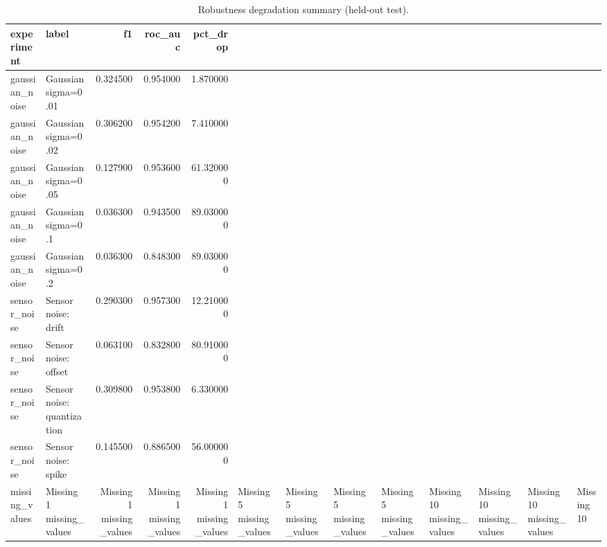 \begin{table}
\caption{Robustness degradation summary (held-out test).}
\label{tab:robustness}
\begin{tabular}{llrrr}
\toprule
experiment & label & f1 & roc_auc & pct_drop \\
\midrule
gaussian_noise & Gaussian sigma=0.01 & 0.324500 & 0.954000 & 1.870000 \\
gaussian_noise & Gaussian sigma=0.02 & 0.306200 & 0.954200 & 7.410000 \\
gaussian_noise & Gaussian sigma=0.05 & 0.127900 & 0.953600 & 61.320000 \\
gaussian_noise & Gaussian sigma=0.1 & 0.036300 & 0.943500 & 89.030000 \\
gaussian_noise & Gaussian sigma=0.2 & 0.036300 & 0.848300 & 89.030000 \\
sensor_noise & Sensor noise: drift & 0.290300 & 0.957300 & 12.210000 \\
sensor_noise & Sensor noise: offset & 0.063100 & 0.832800 & 80.910000 \\
sensor_noise & Sensor noise: quantization & 0.309800 & 0.953800 & 6.330000 \\
sensor_noise & Sensor noise: spike & 0.145500 & 0.886500 & 56.000000 \\
missing_values & Missing 1%
missing_values & Missing 1%
missing_values & Missing 1%
missing_values & Missing 1%
missing_values & Missing 5%
missing_values & Missing 5%
missing_values & Missing 5%
missing_values & Missing 5%
missing_values & Missing 10%
missing_values & Missing 10%
missing_values & Missing 10%
missing_values & Missing 10%

\end{tabular}
\end{table}
